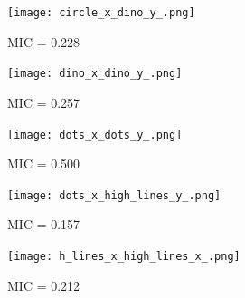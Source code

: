 		\begin{figure}[H]
		\centering
		\texttt{[image: circle\_x\_dino\_y\_.png]}
		\caption{ MIC = 0.228}
		\end{figure}
		
		\begin{figure}[H]
		\centering
		\texttt{[image: dino\_x\_dino\_y\_.png]}
		\caption{ MIC = 0.257}
		\end{figure}
		
		\begin{figure}[H]
		\centering
		\texttt{[image: dots\_x\_dots\_y\_.png]}
		\caption{ MIC = 0.500}
		\end{figure}
		
		\begin{figure}[H]
		\centering
		\texttt{[image: dots\_x\_high\_lines\_y\_.png]}
		\caption{ MIC = 0.157}
		\end{figure}
		
		\begin{figure}[H]
		\centering
		\texttt{[image: h\_lines\_x\_high\_lines\_x\_.png]}
		\caption{ MIC = 0.212}
		\end{figure}

		